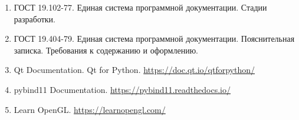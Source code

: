 \documentclass[12pt, a4paper]{article}
\begin{document}
\begin{enumerate}
    \item ГОСТ 19.102-77. Единая система программной документации. Стадии разработки.
    \item ГОСТ 19.404-79. Единая система программной документации. Пояснительная записка. Требования к содержанию и оформлению.
    \item Qt Documentation. Qt for Python. \url{https://doc.qt.io/qtforpython/}
    \item pybind11 Documentation. \url{https://pybind11.readthedocs.io/}
    \item Learn OpenGL. \url{https://learnopengl.com/}
\end{enumerate}
\end{document}
